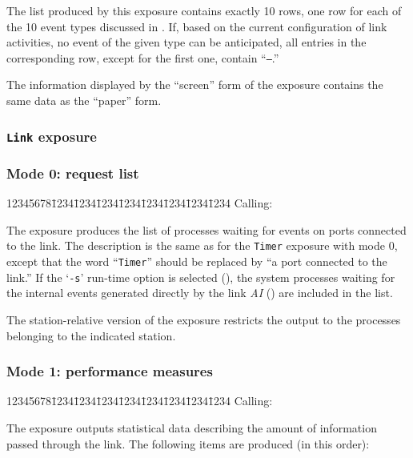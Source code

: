 The list produced by this exposure contains exactly 10 rows, one row
for each of the 10 event types discussed in .
If, based on the current configuration of link activities,
no event of the given type can be anticipated, all entries in
the corresponding row, except for the first one, contain ``{\tt ---}.''

The information displayed by the ``screen'' form of the exposure contains the
same data as the ``paper'' form.

\subsubsection{{\tt Link} exposure}
\label{rm_ex_se_li}

\subsubsection*{Mode 0: request list}

{\tt\begin{tabbing}
12345678\=1234\=1234\=1234\=1234\=1234\=1234\=1234\=1234\kill
{\rm Calling:}
\end{tabbing}}

The exposure produces the
list of processes waiting for events on ports connected to the link.
The description is the same as for the {\tt Timer} exposure
with mode 0, except that the word ``{\tt Timer}'' should be replaced by
``a port connected to the link.''
If the `{\tt -s}' run-time option is selected
(), the system
processes waiting for the internal events generated directly by the link
{\em AI\/} () are included in the list.

The station-relative version of the exposure restricts the output to
the processes belonging to the indicated station.

\subsubsection*{Mode 1: performance measures}

{\tt\begin{tabbing}
12345678\=1234\=1234\=1234\=1234\=1234\=1234\=1234\=1234\kill
{\rm Calling:}
\end{tabbing}}

The exposure outputs statistical data describing the amount of
information passed through the link.
The following items are produced (in this order):

